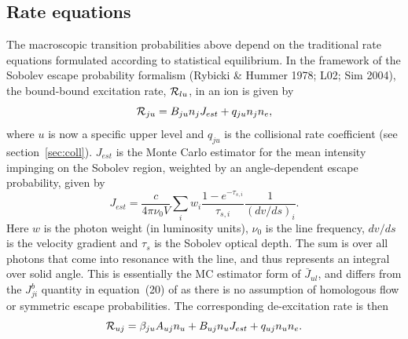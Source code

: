 \subsection{Rate equations}

The macroscopic transition probabilities above depend on the traditional
rate equations formulated according to statistical equilibrium. 
In the framework of the Sobolev escape probability formalism 
(Rybicki \& Hummer 1978; L02; Sim 2004), 
the bound-bound excitation rate, ${\cal R}_{lu}$, in an ion is given by 
\begin{equation}
{\cal R}_{ju} = B_{ju} n_j J_{est} + q_{ju} n_j n_e,
\label{eq:rad_rate}
\end{equation}
where $u$ is now a specific upper level and $q_{ju}$ is the collisional
rate coefficient (see section~\ref{sec:coll}).
$J_{est}$ is the Monte Carlo estimator for the mean intensity 
impinging on the Sobolev region, weighted by an angle-dependent escape probability, 
given by \citep{sim2004}
\begin{equation}
J_{est} = \frac{c}{4 \pi \nu_0 V} \sum_{i} w_i \frac{1 - e^{-\tau_{s,i}}}{\tau_{s,i}} \frac{1}{(dv/ds)_i}.
\end{equation}
Here $w$ is the photon weight (in luminosity units), $\nu_0$
is the line frequency, $dv/ds$ is the velocity gradient and
$\tau_s$ is the Sobolev optical depth.
The sum is over all photons that come into resonance with the line,
and thus represents an integral over solid angle.
This is essentially the MC estimator form of $\bar{J}_{ul}$, and differs
from the $J^b_{ji}$ quantity in equation~(20) of \cite{lucy2002} as 
there is no assumption of homologous flow or symmetric escape probabilities.
The corresponding de-excitation rate is then 
\begin{equation}
{\cal R}_{uj} = \beta_{ju} A_{uj} n_u + B_{uj} n_u J_{est} +
q_{uj} n_u n_e.
\label{eq:nlte_rul}
\end{equation}

